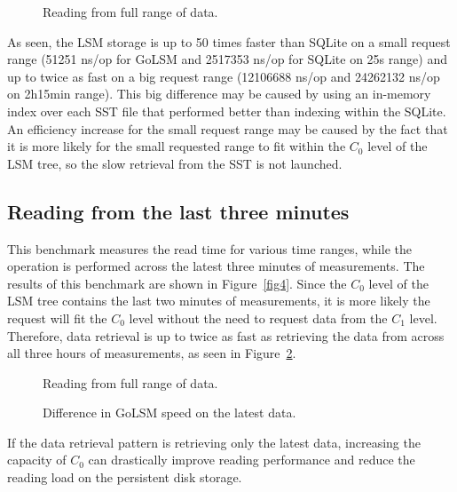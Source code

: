 \begin{figure}[h!]
	\centering
	
	\caption{Reading from full range of data.} \label{fig3}
\end{figure}

As seen, the LSM storage is up to 50 times faster than SQLite on a small request range (51251 ns/op for GoLSM and 2517353 ns/op for SQLite on 25s range) and up to twice as fast on a big request range (12106688 ns/op and 24262132 ns/op on 2h15min range). This big difference may be caused by using an in-memory index over each SST file that performed better than indexing within the SQLite. An efficiency increase for the small request range may be caused by the fact that it is more likely for the small requested range to fit within the $C_0$ level of the LSM tree, so the slow retrieval from the SST is not launched.

\subsection{Reading from the last three minutes}

This benchmark measures the read time for various time ranges, while the operation is performed across the latest three minutes of measurements. The results of this benchmark are shown in Figure~\ref{fig4}. Since the $C_0$ level of the LSM tree contains the last two minutes of measurements, it is more likely the request will fit the $C_0$ level without the need to request data from the $C_1$ level. Therefore, data retrieval is up to twice as fast as retrieving the data from across all three hours of measurements, as seen in Figure~\ref{fig5}. 

\begin{figure}[!htb]
	\begin{minipage}{0.48\textwidth}
		\centering
		\resizebox{\textwidth}{!}{%
			
		}
		\caption{Reading from full range of data.}\label{fig4}
	\end{minipage}\hfill
	\begin{minipage}{0.48\textwidth}
		\centering
		\resizebox{\textwidth}{!}{%
			
		}
		\caption{Difference in GoLSM speed on the latest data.}\label{fig5}
	\end{minipage}
\end{figure}

If the data retrieval pattern is retrieving only the latest data, increasing the capacity of $C_0$ can drastically improve reading performance and reduce the reading load on the persistent disk storage.

